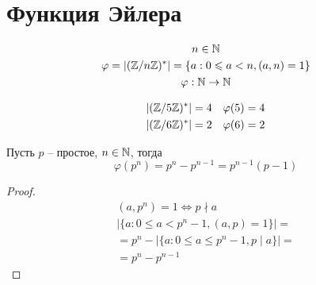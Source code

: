 \documentclass[main]{subfiles}
\begin{document}
\chapter{Функция Эйлера}
\begin{definition}
    \begin{gather*}
        n\in \mathbb{N}\\
        \varphi = | (\mathbb{Z}/n\mathbb{Z})^*| = \{a: 0\leqslant a<n, (a,n) = 1\}\\
        \varphi: \mathbb{N} \to \mathbb{N}
    \end{gather*}
\end{definition}
\begin{example}
    \begin{align*}
        |(\mathbb{Z}/5\mathbb{Z})^*| & = 4 & \varphi(5) & = 4 \\
        |(\mathbb{Z}/6\mathbb{Z})^*| & = 2 & \varphi(6) & = 2
    \end{align*}
\end{example}

\begin{proposition}
    Пусть $p$ -- простое, $n \in \mathbb{N}$, тогда
    \[\varphi(p^n) = p^n - p^{n-1} = p^{n-1}(p-1)\]
\end{proposition}
\begin{proof}
    \begin{gather*}
        (a, p^n) = 1 \Leftrightarrow p \nmid a\\
        |\{a: 0 \le a < p^{n}-1,(a, p) =1\}| = \\
        = p^n - |\{a: 0 \le a \le p^n -1, p \mid a\}| = \\
        = p^n - p^{n-1}
    \end{gather*}
\end{proof}
\end{document}
